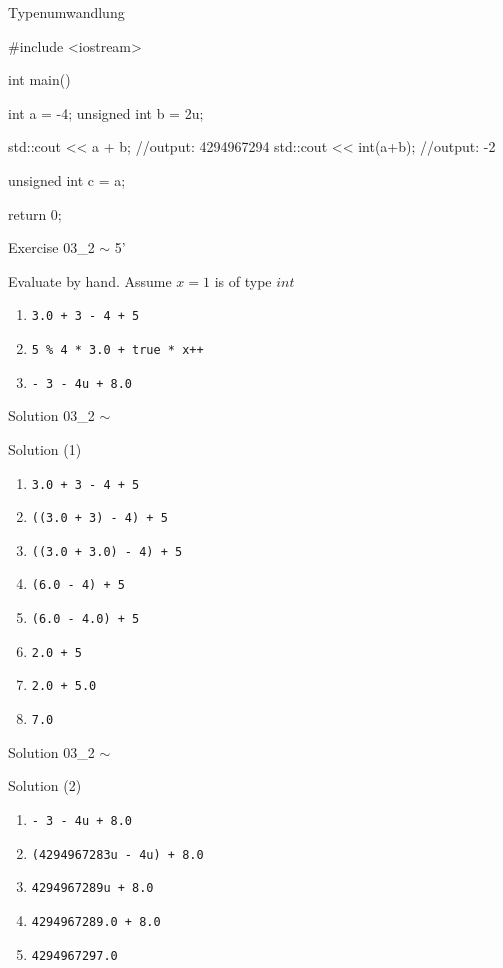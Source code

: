 \documentclass[handout,usenames,dvipsnames]{beamer}
\begin{document}
\begin{frame}[fragile]{Typenumwandlung}
\begin{TFCpp}
#include <iostream>

int main()
{
   int a = -4;
   unsigned int b = 2u;

   std::cout << a + b; //output: 4294967294
   std::cout << int(a+b); //output: -2
   
   unsigned int c = a;

   return 0;
}
\end{TFCpp}
\end{frame}

\begin{frame}[fragile]{Exercise 03\_2 $\sim$ 5'}
\begin{block}{Evaluate by hand. Assume $x = 1$ is of type $int$}
\begin{enumerate}
\item \verb,3.0 + 3 - 4 + 5,
\item \verb,5 % 4 * 3.0 + true * x++,
\item \verb,- 3 - 4u + 8.0,
\end{enumerate}
\end{block}
\end{frame}

\begin{frame}[fragile]{Solution 03\_2 $\sim$ }
\begin{block}{Solution (1)}
\begin{enumerate}
\item \verb,3.0 + 3 - 4 + 5,
\item \verb,((3.0 + 3) - 4) + 5,
\item \verb,((3.0 + 3.0) - 4) + 5,
\item \verb,(6.0 - 4) + 5,
\item \verb,(6.0 - 4.0) + 5,
\item \verb,2.0 + 5,
\item \verb,2.0 + 5.0,
\item \verb,7.0,
\end{enumerate}
\end{block}
\end{frame}

\begin{frame}[fragile]{Solution 03\_2 $\sim$ }
\begin{block}{Solution (2)}
\begin{enumerate}
\item \verb,- 3 - 4u + 8.0,
\item \verb,(4294967283u - 4u) + 8.0,
\item \verb,4294967289u + 8.0,
\item \verb,4294967289.0 + 8.0,
\item \verb,4294967297.0,
\end{enumerate}
\end{block}
\end{frame}
\end{document}

